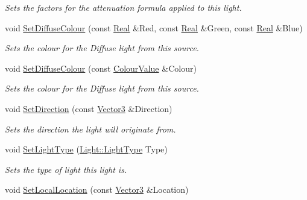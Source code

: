 \begin{DoxyCompactItemize}
\begin{DoxyCompactList}\small\item\em Sets the factors for the attenuation formula applied to this light. \item\end{DoxyCompactList}\item 
void \hyperlink{classMezzanine_1_1Light_ae18656f81c8f9ac9490adb9f9d225c5c}{SetDiffuseColour} (const \hyperlink{namespaceMezzanine_a726731b1a7df72bf3583e4a97282c6f6}{Real} \&Red, const \hyperlink{namespaceMezzanine_a726731b1a7df72bf3583e4a97282c6f6}{Real} \&Green, const \hyperlink{namespaceMezzanine_a726731b1a7df72bf3583e4a97282c6f6}{Real} \&Blue)
\begin{DoxyCompactList}\small\item\em Sets the colour for the Diffuse light from this source. \item\end{DoxyCompactList}\item 
void \hyperlink{classMezzanine_1_1Light_a577e92239a463c40207dc749b3f6c14a}{SetDiffuseColour} (const \hyperlink{classMezzanine_1_1ColourValue}{ColourValue} \&Colour)
\begin{DoxyCompactList}\small\item\em Sets the colour for the Diffuse light from this source. \item\end{DoxyCompactList}\item 
void \hyperlink{classMezzanine_1_1Light_a22cbfb15ef1c7caf1011574f568d19de}{SetDirection} (const \hyperlink{classMezzanine_1_1Vector3}{Vector3} \&Direction)
\begin{DoxyCompactList}\small\item\em Sets the direction the light will originate from. \item\end{DoxyCompactList}\item 
void \hyperlink{classMezzanine_1_1Light_aedd1d87f5d1dffac4633ca8fe9ab4e15}{SetLightType} (\hyperlink{classMezzanine_1_1Light_a783df27d8261c5af2226bc75586944be}{Light::LightType} Type)
\begin{DoxyCompactList}\small\item\em Sets the type of light this light is. \item\end{DoxyCompactList}\item 
void \hyperlink{classMezzanine_1_1Light_a16815beba535ae398e8ae6016c6579f6}{SetLocalLocation} (const \hyperlink{classMezzanine_1_1Vector3}{Vector3} \&Location)

\end{DoxyCompactItemize}
